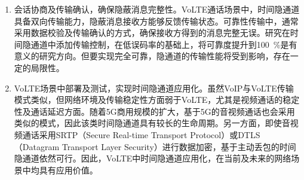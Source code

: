 \begin{conclusion}
\begin{enumerate}
    \item
    会话协商及传输确认，确保隐蔽消息完整性。VoLTE通话场景中，时间隐通道具备双向传输能力，隐蔽消息接收方能够反馈传输状态。可靠性传输中，通常采用数据校验及传输确认的方式，确保接收方得到的消息完整无误。研究在时间隐通道中添加传输控制，在低误码率的基础上，将可靠度提升到{100\ \%}是有意义的研究方向。但要实现完全可靠，隐通道的传输性能将受到影响，存在一定的局限性。
    
    \item
    VoLTE场景中部署及测试，实现时间隐通道应用化。虽然VoIP与VoLTE传输模式类似，但网络环境及传输稳定性方面弱于VoLTE，尤其是视频通话的稳定性及通话延迟方面。随着5G商用规模的扩大，基于5G的音视频通话也会采用类似的模式，因此该类时间隐通道具有较长的生命周期。另一方面，即使音视频通话采用SRTP（Secure Real-time Transport Protocol）或DTLS（Datagram Transport Layer Security）进行数据加密，基于主动丢包的时间隐通道依然可行。因此，VoLTE中时间隐通道应用化，在当前及未来的网络场景中均具有应用价值。

\end{enumerate}

\end{conclusion}